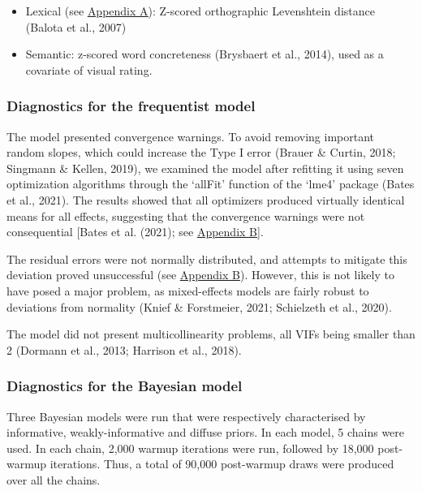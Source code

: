 \documentclass[
  12pt,
  man,floatsintext]{apa7}
\begin{document}
\begin{itemize}
\item
  Lexical (see \protect\hyperlink{appendix-A-lexical-covariates}{\underline{Appendix A}}): Z-scored orthographic Levenshtein distance (Balota et al., 2007)
\item
  Semantic: z-scored word concreteness (Brysbaert et al., 2014), used as a covariate of visual rating.
\end{itemize}

\hypertarget{diagnostics-for-the-frequentist-model-3}{%
\subsubsection{Diagnostics for the frequentist model}\label{diagnostics-for-the-frequentist-model-3}}

The model presented convergence warnings. To avoid removing important random slopes, which could increase the Type I error (Brauer \& Curtin, 2018; Singmann \& Kellen, 2019), we examined the model after refitting it using seven optimization algorithms through the `allFit' function of the `lme4' package (Bates et al., 2021). The results showed that all optimizers produced virtually identical means for all effects, suggesting that the convergence warnings were not consequential {[}Bates et al. (2021); see \protect\hyperlink{appendix-B-frequentist-analysis-diagnostics}{\underline{Appendix B}}{]}.

The residual errors were not normally distributed, and attempts to mitigate this deviation proved unsuccessful (see \protect\hyperlink{appendix-B-frequentist-analysis-diagnostics}{\underline{Appendix B}}). However, this is not likely to have posed a major problem, as mixed-effects models are fairly robust to deviations from normality (Knief \& Forstmeier, 2021; Schielzeth et al., 2020).

The model did not present multicollinearity problems, all VIFs being smaller than 2 (Dormann et al., 2013; Harrison et al., 2018).

\hypertarget{diagnostics-for-the-bayesian-model-2}{%
\subsubsection{Diagnostics for the Bayesian model}\label{diagnostics-for-the-bayesian-model-2}}

Three Bayesian models were run that were respectively characterised by informative, weakly-informative and diffuse priors. In each model, 5 chains were used. In each chain, 2,000 warmup iterations were run, followed by 18,000 post-warmup iterations. Thus, a total of 90,000 post-warmup draws were produced over all the chains.
\end{document}
